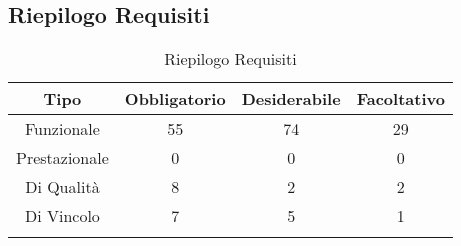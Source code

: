 \subsection{Riepilogo Requisiti}
\normalsize
\begin{longtable}{|c|c|c|c|}
\hline
\textbf{Tipo} & \textbf{Obbligatorio} & \textbf{Desiderabile} & \textbf{Facoltativo}\\
\hline
Funzionale & 55 & 74 & 29\\ \hline
Prestazionale & 0 & 0 & 0\\ \hline
Di Qualità & 8 & 2 & 2\\ \hline
Di Vincolo & 7 & 5 & 1\\ \hline
\caption[Riepilogo Requisiti]{Riepilogo Requisiti}
\label{tabella:riepilogorequi}
\end{longtable}
\clearpage
